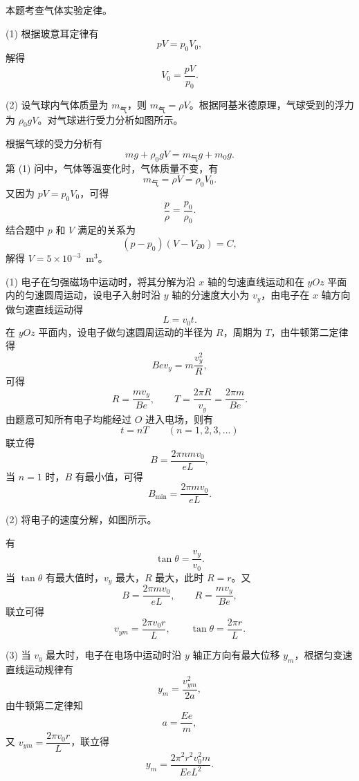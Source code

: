 \begin{answer}
本题考查气体实验定律。

(1) 根据玻意耳定律有
\[
  pV=p_{0}V_{0},
\]
解得
\[
  V_{0}=\frac{pV}{p_{0}}.
\]

(2) 设气球内气体质量为 $m_{\text{气}}$，则 $m_{\text{气}}=\rho V$。根据阿基米德原理，气球受到的浮力为 $\rho_{0}gV$。对气球进行受力分析如图所示。


根据气球的受力分析有
\[
  mg+\rho_{0}gV=m_{\text{气}}g+m_{0}g.
\]
第 (1) 问中，气体等温变化时，气体质量不变，有
\[
  m_{\text{气}}=\rho V=\rho_{0}V_{0}.
\]
又因为 $pV=p_{0}V_{0}$，可得
\[
  \frac{p}{\rho}=\frac{p_{0}}{\rho_{0}}.
\]
结合题中 $p$ 和 $V$ 满足的关系为
\[
  (p-p_{0})(V-V_{B0})=C,
\]
解得 $V=5\times10^{-3}$~m$^{3}$。
\end{answer}

\begin{answer}
(1) 电子在匀强磁场中运动时，将其分解为沿 $x$ 轴的匀速直线运动和在 $yOz$ 平面内的匀速圆周运动，设电子入射时沿 $y$ 轴的分速度大小为 $v_{y}$，由电子在 $x$ 轴方向做匀速直线运动得
\[
  L=v_{0}t.
\]
在 $yOz$ 平面内，设电子做匀速圆周运动的半径为 $R$，周期为 $T$，由牛顿第二定律得
\[
  Bev_{y}=m\frac{v_{y}^{2}}{R},
\]
可得
\[
  R=\frac{mv_{y}}{Be},\qquad T=\frac{2\pi R}{v_{y}}=\frac{2\pi m}{Be}.
\]
由题意可知所有电子均能经过 $O$ 进入电场，则有
\[
  t=nT\qquad(n=1,2,3,\dots)
\]
联立得
\[
  B=\frac{2\pi nmv_{0}}{eL},
\]
当 $n=1$ 时，$B$ 有最小值，可得
\[
  B_{\min}=\frac{2\pi mv_{0}}{eL}.
\]

(2) 将电子的速度分解，如图所示。


有
\[
  \tan\theta=\frac{v_{y}}{v_{0}}.
\]
当 $\tan\theta$ 有最大值时，$v_{y}$ 最大，$R$ 最大，此时 $R=r$。又
\[
  B=\frac{2\pi mv_{0}}{eL},\qquad R=\frac{mv_{y}}{Be},
\]
联立可得
\[
  v_{ym}=\frac{2\pi v_{0}r}{L},\qquad \tan\theta=\frac{2\pi r}{L}.
\]

(3) 当 $v_{y}$ 最大时，电子在电场中运动时沿 $y$ 轴正方向有最大位移 $y_{m}$，根据匀变速直线运动规律有
\[
  y_{m}=\frac{v_{ym}^{2}}{2a},
\]
由牛顿第二定律知
\[
  a=\frac{Ee}{m},
\]
又 $v_{ym}=\dfrac{2\pi v_{0}r}{L}$，联立得
\[
  y_{m}=\frac{2\pi^{2}r^{2}v_{0}^{2}m}{EeL^{2}}.
\]
\end{answer}


